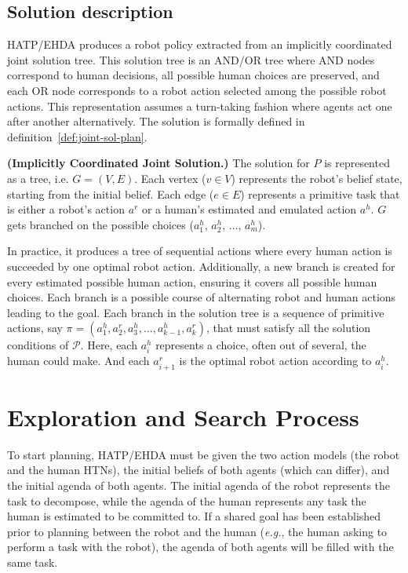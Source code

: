 \subsection*{Solution description}

HATP/EHDA produces a robot policy extracted from an implicitly coordinated joint solution tree. This solution tree is an AND/OR tree where AND nodes correspond to human decisions, all possible human choices are preserved, and each OR node corresponds to a robot action selected among the possible robot actions. This representation assumes a turn-taking fashion where agents act one after another alternatively. The solution is formally defined in definition~\ref{def:joint-sol-plan}.

\begin{definition} 
    \label{def:joint-sol-plan}
    \textbf{(Implicitly Coordinated Joint Solution.)} 
    {The solution for $P$ is represented as a tree, i.e. $G=(V,E)$. Each vertex ($v \in V$) represents the robot's belief state, starting from the initial belief. Each edge ($e \in E$) represents a primitive task that is either a robot's action $a^{r}$ or a human's estimated and emulated action $a^{h}$. $G$ gets branched on the possible choices ($a^{h}_1$, $a^{h}_2$, ..., $a^{h}_m$). 
    }  
    \end{definition}
    
In practice, it produces a tree of sequential actions where every human action is succeeded by one optimal robot action. Additionally, a new branch is created for every estimated possible human action, ensuring it covers all possible human choices. Each branch is a possible course of alternating robot and human actions leading to the goal.
Each branch in the solution tree is a sequence of primitive actions, say $\pi=(a_1^h,a_2^r,a_3^h,...,a_{k-1}^h,a_k^r)$, that must satisfy all the solution conditions of $\mathcal{P}$. 
Here, each $a_i^h$ represents a choice, often out of several, the human could make. And each $a_{i+1}^r$ is the optimal robot action according to $a_i^h$.


\section{Exploration and Search Process}

To start planning, HATP/EHDA must be given the two action models (the robot and the human HTNs), the initial beliefs of both agents (which can differ), and the initial agenda of both agents. The initial agenda of the robot represents the task to decompose, while the agenda of the human represents any task the human is estimated to be committed to. If a shared goal has been established prior to planning between the robot and the human (\textit{e.g.}, the human asking to perform a task with the robot), the agenda of both agents will be filled with the same task.

